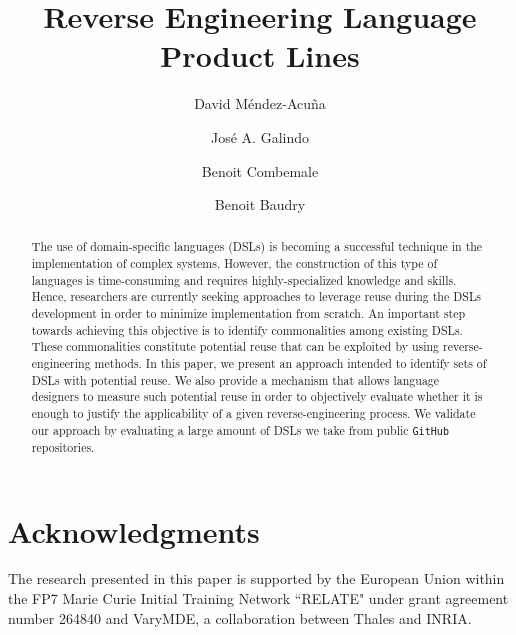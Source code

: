 \documentclass[runningheads,a4paper]{llncs}
\begin{document}
\mainmatter  %

\title{Reverse Engineering Language Product Lines}


\author{David M\'endez-Acu\~na \and Jos\'e A. Galindo \and Benoit Combemale \and Benoit Baudry}

\maketitle

\begin{abstract} 

The use of domain-specific languages (DSLs) is becoming a successful technique in the implementation of complex systems. However, the construction of this type of languages is time-consuming and requires highly-specialized knowledge and skills. Hence, researchers are currently seeking approaches to leverage reuse during the DSLs development in order to minimize implementation from scratch. An important step towards achieving this objective is to identify commonalities among existing DSLs. These commonalities constitute potential reuse that can be exploited by using reverse-engineering methods. In this paper, we present an approach intended to identify sets of DSLs with potential reuse. We also provide a mechanism that allows language designers to measure such potential reuse in order to objectively evaluate whether it is enough to justify the applicability of a given reverse-engineering process. We validate our approach by evaluating a large amount of DSLs we take from public \texttt{GitHub} repositories.

\end{abstract}



\section*{Acknowledgments}
The research presented in this paper is supported by the European Union within the FP7 Marie Curie Initial Training Network ``RELATE" under grant agreement number 264840 and VaryMDE, a collaboration between Thales and INRIA.



\end{document}
